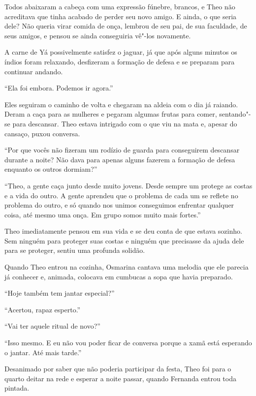 Todos abaixaram a cabeça com uma expressão fúnebre, brancos, e Theo não
acreditava que tinha acabado de perder seu novo amigo. E ainda, o que
seria dele? Não queria virar comida de onça, lembrou de seu pai, de
sua faculdade, de seus amigos, e pensou se ainda conseguiria vê"-los
novamente.

A carne de Yá possivelmente satisfez o jaguar, já que após alguns
minutos os índios foram relaxando, desfizeram a formação de defesa e se
preparam para continuar andando.

``Ela foi embora. Podemos ir agora.''

Eles seguiram o caminho de volta e chegaram na aldeia com o dia já
raiando. Deram a caça para as mulheres e pegaram algumas frutas para
comer, sentando"-se para descansar. Theo estava intrigado com o que viu
na mata e, apesar do cansaço, puxou conversa.

``Por que vocês não fizeram um rodízio de guarda para conseguirem
descansar durante a noite? Não dava para apenas alguns fazerem a
formação de defesa enquanto os outros dormiam?''

``Theo, a gente caça junto desde muito jovens. Desde sempre um protege
as costas e a vida do outro. A gente aprendeu que o problema de cada um
se reflete no problema do outro, e só quando nos unimos conseguimos
enfrentar qualquer coisa, até mesmo uma onça. Em grupo somos muito mais
fortes.''

Theo imediatamente pensou em sua vida e se deu conta de que estava
sozinho. Sem ninguém para proteger suas costas e ninguém que precisasse
da ajuda dele para se proteger, sentiu uma profunda solidão.

\asterisc


Quando Theo entrou na cozinha, Osmarina cantava uma melodia que ele
parecia já conhecer e, animada, colocava em cumbucas a sopa que havia
preparado.

``Hoje também tem jantar especial?''

``Acertou, rapaz esperto.''

``Vai ter aquele ritual de novo?''

``Isso mesmo. E eu não vou poder ficar de conversa porque a xamã está
esperando o jantar. Até mais tarde.''

Desanimado por saber que não poderia participar da festa, Theo foi para
o quarto deitar na rede e esperar a noite passar, quando Fernanda entrou
toda pintada.

